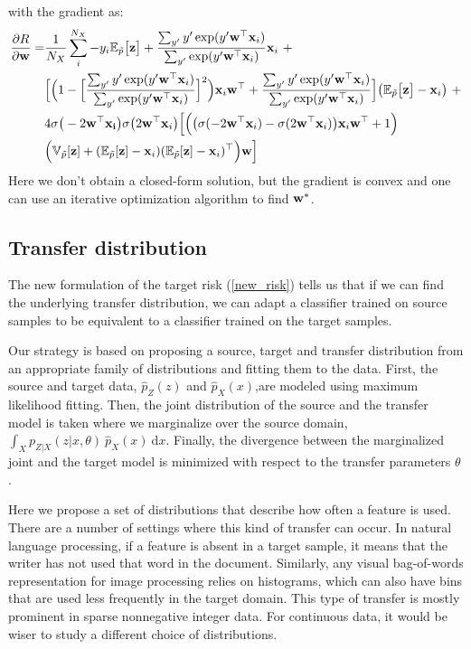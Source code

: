\documentclass[twoside,11pt]{article}
\begin{document}
with the gradient as:
\begin{align}
\frac{\partial R }{\partial{\bf w}} =& \frac{1}{N_{X}} \sum_{i}^{N_{X}} -y_{i}\mathbb{E}_{\tilde{p}}\big[{\bf z}\big] + \frac{\sum_{y'} y'\exp(y'{\bf w}^{\top}{\bf x}_{i})}{\sum_{y'}\exp(y'{\bf w}^{\top}{\bf x}_{i})}{\bf x}_{i} \ + \nonumber \\
& \Big[\Big(1-\Big[\frac{\sum_{y'}y'\exp(y'{\bf w}^{\top}{\bf x}_{i})}{\sum_{y'}\exp(y'{\bf w}^{\top}{\bf x}_{i})}\Big]^{2}\Big) {\bf x}_{i}{\bf w}^{\top} + \frac{\sum_{y'} y'\exp(y'{\bf w}^{\top}{\bf x}_{i})}{\sum_{y'}\exp(y'{\bf w}^{\top}{\bf x}_{i})}\Big]\big(\mathbb{E}_{\tilde{p}}\big[{\bf z} \big]-{\bf x}_{i}\big) \ + \nonumber \\
& 4\sigma \big(-2{\bf w^{\top}x_{i}}\big)\sigma \big(2{\bf w^{\top}x}_{i}\big)\Big[\Big(\big(\sigma(-2{\bf w}^{\top}{\bf x}_{i}) - \sigma(2{\bf w}^{\top}{\bf x}_{i})\big){\bf x}_{i}{\bf w}^{\top} + 1\Big) \nonumber \\
& \Big(\mathbb{V}_{\tilde{p}}[{\bf z}] + (\mathbb{E}_{\tilde{p}}[{\bf z}]-{\bf x}_{i})(\mathbb{E}_{\tilde{p}}[{\bf z}]-{\bf x}_{i})^{\top} \Big){\bf w}\Big]
\end{align}
Here we don't obtain a closed-form solution, but the gradient is convex and one can use an iterative optimization algorithm to find ${\bf w}^{*}$.

\subsection{Transfer distribution}
The new formulation of the target risk (\ref{new_risk}) tells us that if we can find the underlying transfer distribution, we can adapt a classifier trained on source samples to be equivalent to a classifier trained on the target samples. 

Our strategy is based on proposing a source, target and transfer distribution from an appropriate family of distributions and fitting them to the data. First, the source and target data, $\hat{p}_{Z}(z)$ and $\hat{p}_{X}(x)$,are modeled using maximum likelihood fitting. Then, the joint distribution of the source and the transfer model is taken where we marginalize over the source domain, $\int_{X} p_{Z|X}(z|x, \theta) \ \hat{p}_{X}(x) \ \mathrm{d}x$. Finally, the divergence between the marginalized joint and the target model is minimized with respect to the transfer parameters $\theta$.

Here we propose a set of distributions that describe how often a feature is used. There are a number of settings where this kind of transfer can occur. In natural language processing, if a feature is absent in a target sample, it means that the writer has not used that word in the document. Similarly, any visual bag-of-words representation for image processing relies on histograms, which can also have bins that are used less frequently in the target domain. 
This type of transfer is mostly prominent in sparse nonnegative integer data. For continuous data, it would be wiser to study a different choice of distributions.
\end{document}

